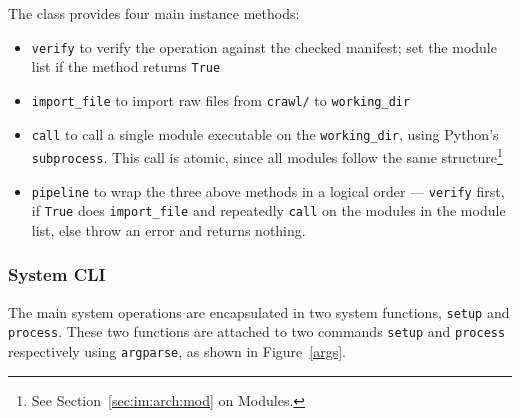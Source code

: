 The class provides four main instance methods:

\begin{itemize}
    \item \texttt{verify} to verify the operation against the checked
    manifest; set the module list if the method returns \texttt{True}
    \item \texttt{import\_file} to import raw files from \texttt{crawl/}
    to \texttt{working\_dir}
    \item \texttt{call} to call a single module executable on the
    \texttt{working\_dir}, using Python's \texttt{subprocess}. This call
    is atomic, since all modules follow the same structure\footnote{See
    Section~\ref{sec:im:arch:mod} on Modules.}
    \item \texttt{pipeline} to wrap the three above methods in a logical
    order --- \texttt{verify} first, if \texttt{True} does
    \texttt{import\_file} and repeatedly \texttt{call} on the modules
    in the module list, else throw an error and returns nothing. 
\end{itemize}

\subsubsection{System CLI}

The main system operations are encapsulated in two system functions,
\texttt{setup} and \texttt{process}. These two functions are attached
to two commands \texttt{setup} and \texttt{process} respectively
using \texttt{argparse}, as shown in Figure~\ref{args}.

